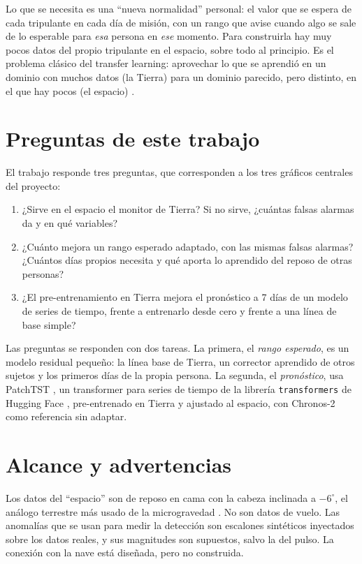 Lo que se necesita es una \enquote{nueva normalidad} personal: el valor que se espera de cada tripulante en cada día de
misión, con un rango que avise cuando algo se sale de lo esperable para \emph{esa} persona en \emph{ese} momento. Para
construirla hay muy pocos datos del propio tripulante en el espacio, sobre todo al principio. Es el problema clásico
del transfer learning: aprovechar lo que se aprendió en un dominio con muchos datos (la Tierra) para un dominio
parecido, pero distinto, en el que hay pocos (el espacio) \parencite{pan2010}.

\section{Preguntas de este trabajo}

El trabajo responde tres preguntas, que corresponden a los tres gráficos centrales del proyecto:

\begin{enumerate}[label=\textbf{P\arabic*.}, leftmargin=2.2em]
\item ¿Sirve en el espacio el monitor de Tierra? Si no sirve, ¿cuántas falsas alarmas da y en qué variables?
\item ¿Cuánto mejora un rango esperado adaptado, con las mismas falsas alarmas? ¿Cuántos días propios necesita y qué
  aporta lo aprendido del reposo de otras personas?
\item ¿El pre-entrenamiento en Tierra mejora el pronóstico a 7 días de un modelo de series de tiempo, frente a
  entrenarlo desde cero y frente a una línea de base simple?
\end{enumerate}

Las preguntas se responden con dos tareas. La primera, el \emph{rango esperado}, es un modelo residual pequeño: la
línea base de Tierra, un corrector aprendido de otros sujetos y los primeros días de la propia persona. La segunda, el
\emph{pronóstico}, usa PatchTST \parencite{nie2023}, un transformer para series de tiempo de la librería
\texttt{transformers} de Hugging Face \parencite{wolf2020}, pre-entrenado en Tierra y ajustado al espacio, con
Chronos-2 \parencite{ansari2025} como referencia sin adaptar.

\section{Alcance y advertencias}

\begin{cuidado}
Los datos del \enquote{espacio} son de reposo en cama con la cabeza inclinada a $-6^\circ$, el análogo terrestre más
usado de la microgravedad \parencite{pavy2007,hargens2016}. No son datos de vuelo. Las anomalías que se usan para medir
la detección son escalones sintéticos inyectados sobre los datos reales, y sus magnitudes son supuestos, salvo la del
pulso. La conexión con la nave está diseñada, pero no construida.
\end{cuidado}

